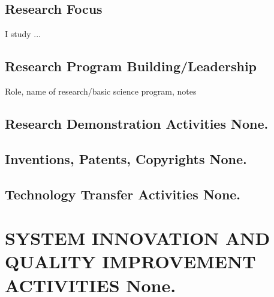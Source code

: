 \documentclass[11pt]{article}
\newenvironment{lyxlist}[1]
	{\begin{list}{}
		{\setlength\itemsep{-0.5ex}
		\settowidth{\labelwidth}{#1}
		 \setlength{\leftmargin}{\labelwidth}
		 \addtolength{\leftmargin}{\labelsep}
		 \renewcommand{\makelabel}[1]{##1\hfil}}}
	{\end{list}}
\begin{document}
\subsection*{Research Focus}
I study ...

\subsection*{Research Program Building/Leadership}

\begin{lyxlist}{M/YY \textendash M/YY}
\item[{M/YY\textendash M/YY}]Role, name of research/basic science program, notes

\end{lyxlist}
	
\subsection*{Research Demonstration Activities \normalfont\textcolor{color0}{None.}}

\subsection*{Inventions, Patents, Copyrights \normalfont\textcolor{color0}{None.}}

\subsection*{Technology Transfer Activities \normalfont\textcolor{color0}{None.}}

\section*{SYSTEM INNOVATION AND QUALITY IMPROVEMENT ACTIVITIES \normalfont\textcolor{color0}{None.}}
\end{document}
